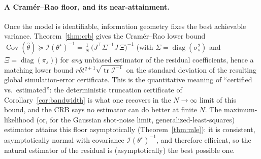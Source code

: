 \documentclass[aps,prxquantum,reprint,superscriptaddress,nofootinbib,amsmath,amssymb]{revtex4-2}
\newcommand{\dt}{\delta t}
\begin{document}
\paragraph{A Cram\'er--Rao floor, and its near-attainment.} Once the model is identifiable, information geometry fixes the best achievable variance. Theorem~\ref{thm:crb} gives the Cram\'er--Rao lower bound $\operatorname{Cov}(\hat\theta)\succeq\mathcal{I}(\theta^\star)^{-1}=\tfrac1N\,\bigl(J^\top\Sigma^{-1}J\,\Xi\bigr)^{-1}$ (with $\Sigma=\operatorname{diag}(\sigma_s^2)$ and $\Xi=\operatorname{diag}(\pi_s)$) for \emph{any} unbiased estimator of the residual coefficients, hence a matching lower bound $r\dt^{q+1}\!\sqrt{\operatorname{tr}\mathcal{I}^{-1}}$ on the standard deviation of the resulting global simulation-error certificate. This is the quantitative meaning of ``certified vs.\ estimated'': the deterministic truncation certificate of Corollary~\ref{cor:bandwidth} is what one recovers in the $N\to\infty$ limit of this bound, and the CRB says no estimator can do better at finite $N$. The maximum-likelihood (or, for the Gaussian shot-noise limit, generalized-least-squares) estimator attains this floor asymptotically (Theorem~\ref{thm:mle}): it is consistent, asymptotically normal with covariance $\mathcal{I}(\theta^\star)^{-1}$, and therefore efficient, so the natural estimator of the residual is (asymptotically) the best possible one.
\end{document}
